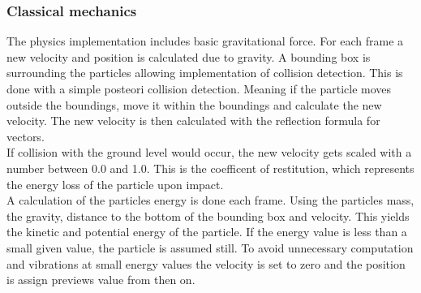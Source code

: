 \documentclass[report]{vgtc}
\begin{document}
\subsubsection{Classical mechanics}
The physics implementation includes basic gravitational force. For each frame a new velocity and position is calculated due to gravity. 
A bounding box is surrounding the particles allowing implementation of collision detection. This is done with a simple posteori collision detection. Meaning if the particle moves outside the boundings, move it within the boundings and calculate the new velocity. The new velocity is then calculated with the reflection formula for vectors.\\
If collision with the ground level would occur, the new velocity gets scaled with a number between 0.0 and 1.0. This is the coefficent of restitution, which represents the energy loss of the particle upon impact.\\
A calculation of the particles energy is done each frame. Using the particles mass, the gravity, distance to the bottom of the bounding box and velocity. This yields the kinetic and potential energy of the particle. If the energy value is less than a small given value, the particle is assumed still. To avoid unnecessary computation and vibrations at small energy values the velocity is set to zero and the position is assign previews value from then on.
\end{document}
